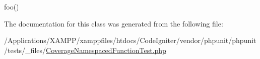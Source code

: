 foo() 

The documentation for this class was generated from the following file\+:\begin{DoxyCompactItemize}
\item 
/\+Applications/\+X\+A\+M\+P\+P/xamppfiles/htdocs/\+Code\+Igniter/vendor/phpunit/phpunit/tests/\+\_\+files/\mbox{\hyperlink{_coverage_namespaced_function_test_8php}{Coverage\+Namespaced\+Function\+Test.\+php}}\end{DoxyCompactItemize}
